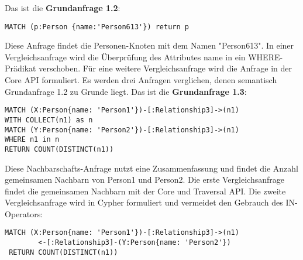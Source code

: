 \noindent Das ist die \textbf{Grundanfrage 1.2}: 
\begin{Verbatim}[frame=single]
MATCH (p:Person {name:'Person613'}) return p
\end{Verbatim} 
Diese Anfrage findet die Personen-Knoten mit dem Namen "Person613". In einer Vergleichsanfrage wird die Überprüfung des Attributes name in ein WHERE-Prädikat verschoben. Für eine weitere Vergleichsanfrage wird die Anfrage in der Core API formuliert. Es werden drei Anfragen verglichen, denen semantisch Grundanfrage 1.2 zu Grunde liegt.\newline \newline
Das ist die \textbf{Grundanfrage 1.3}: 
\begin{Verbatim}[frame=single]
MATCH (X:Person{name: 'Person1'})-[:Relationship3]->(n1) 
WITH COLLECT(n1) as n 
MATCH (Y:Person{name: 'Person2'})-[:Relationship3]->(n1) 
WHERE n1 in n
RETURN COUNT(DISTINCT(n1))
\end{Verbatim} 
Diese Nachbarschafts-Anfrage nutzt eine Zusammenfassung und findet die Anzahl gemeinsamen Nachbarn von Person1 und Person2. Die erste Vergleichsanfrage findet die gemeinsamen Nachbarn mit der Core und Traversal API. Die zweite  Vergleichsanfrage wird in Cypher formuliert und vermeidet den Gebrauch des IN-Operators:
\begin{Verbatim}[frame=single]
 MATCH (X:Person{name: 'Person1'})-[:Relationship3]->(n1)
 		<-[:Relationship3]-(Y:Person{name: 'Person2'}) 
 RETURN COUNT(DISTINCT(n1))
\end{Verbatim} 

